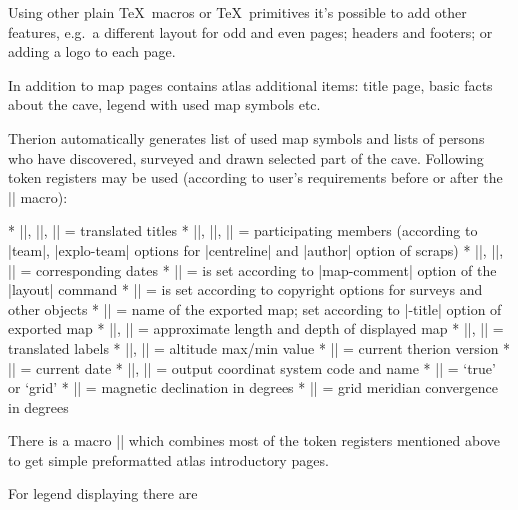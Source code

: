 Using other plain \TeX\ macros or \TeX\ primitives it's possible to add other features, e.g.~a different layout for odd and even pages; headers and footers; or adding a logo to each page. 

In addition to map pages contains atlas additional items: title page, basic facts about the cave, legend with used map symbols etc. 

Therion automatically generates list of used map symbols and lists of persons who have discovered, surveyed and drawn selected part of the cave. Following token registers may be used (according to user's requirements before or after the |\insertmaps| macro): 

\list

* |\explotitle|, |\topotitle|, |\cartotitle| = translated titles * |\exploteam|, |\topoteam|, |\cartoteam| = participating members (according to |team|, |explo-team| options for |centreline| and |author| option of scraps) * |\explodate|, |\topodate|, |\cartodate| = corresponding dates * |\comment| = is set according to |map-comment| option of the |layout| command * |\copyrights| = is set according to copyright options for surveys and other objects * |\cavename| = name of the exported map; set according to |-title| option of exported map * |\cavelength|, |\cavedepth| = approximate length and depth of displayed map * |\cavelengthtitle|, |\cavedepthtitle| = translated labels * |\cavemaxz|, |\caveminz| = altitude max/min value * |\thversion| = current therion version * |\currentdate| = current date * |\outcscode|, |\outcsname| = output coordinat system code and name * |\northdir| = `true' or `grid' * |\magdecl| = magnetic declination in degrees * |\gridconv| = grid meridian convergence in degrees \endlist

There is a macro |\atlastitlepages| which combines most of the token registers mentioned above to get simple preformatted atlas introductory pages. 

For legend displaying there are 

\list

